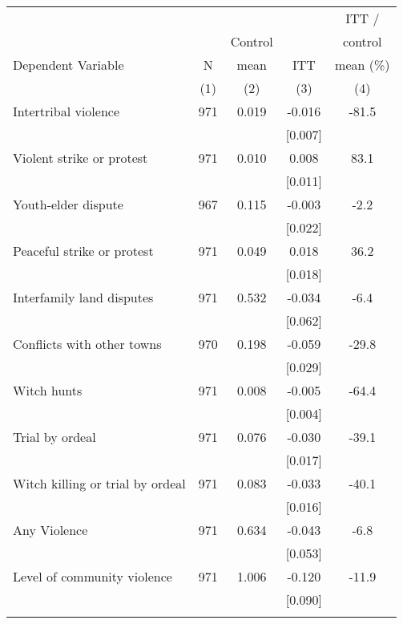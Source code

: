 \begin{tabular}{lcccc}
\hline \noalign{\smallskip} &  &  &  & ITT /\\
 &  & Control &  & control\\
Dependent Variable & N & mean & ITT & mean (\%)\\
 & (1) & (2) & (3) & (4)\\
\noalign{\smallskip}\hline \noalign{\smallskip}\quad Intertribal violence & 971 & 0.019 & -0.016 & -81.5\\
 &  &  & [0.007] & \\
\quad Violent strike or protest & 971 & 0.010 & 0.008 & 83.1\\
 &  &  & [0.011] & \\
\quad Youth-elder dispute & 967 & 0.115 & -0.003 & -2.2\\
 &  &  & [0.022] & \\
\quad Peaceful strike or protest & 971 & 0.049 & 0.018 & 36.2\\
 &  &  & [0.018] & \\
\quad Interfamily land disputes & 971 & 0.532 & -0.034 & -6.4\\
 &  &  & [0.062] & \\
\quad Conflicts with other towns & 970 & 0.198 & -0.059 & -29.8\\
 &  &  & [0.029] & \\
\quad Witch hunts & 971 & 0.008 & -0.005 & -64.4\\
 &  &  & [0.004] & \\
\quad Trial by ordeal & 971 & 0.076 & -0.030 & -39.1\\
 &  &  & [0.017] & \\
Witch killing or trial by ordeal & 971 & 0.083 & -0.033 & -40.1\\
 &  &  & [0.016] & \\
Any Violence & 971 & 0.634 & -0.043 & -6.8\\
 &  &  & [0.053] & \\
Level of community violence & 971 & 1.006 & -0.120 & -11.9\\
 &  &  & [0.090] & \\
\noalign{\smallskip}\hline\end{tabular}
